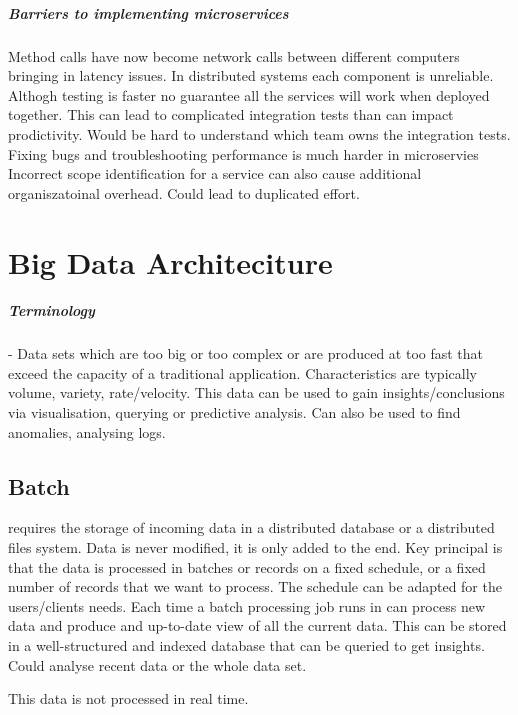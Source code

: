 \documentclass[a4paper, 11pt]{book}
\begin{document}
    \paragraph{Barriers to implementing microservices}
    Method calls have now become network calls between different computers bringing in latency issues.
    In distributed systems each component is unreliable.
    Althogh testing is faster no guarantee all the services will work when deployed together.
    This can lead to complicated integration tests than can impact prodictivity.
    Would be hard to understand which team owns the integration tests.
    Fixing bugs and troubleshooting performance is much harder in microservies
    Incorrect scope identification for a service can also cause additional organiszatoinal overhead.
    Could lead to duplicated effort.


    \chapter{Big Data Architeciture}

    \paragraph{Terminology} - Data sets which are too big or too complex or are produced at too fast that exceed the capacity of a traditional application.
    Characteristics are typically volume, variety, rate/velocity.
    This data can be used to gain insights/conclusions via visualisation, querying or predictive analysis.
    Can also be used to find anomalies, analysing logs.


    \section{Batch}
    requires the storage of incoming data in a distributed database or a distributed files system.
    Data is never modified, it is only added to the end.
    Key principal is that the data is processed in batches or records on a fixed schedule, or a fixed number of records that we want to process.
    The schedule can be adapted for the users/clients needs.
    Each time a batch processing job runs in can process new data and produce and up-to-date view of all the current data.
    This can be stored in a well-structured and indexed database that can be queried to get insights.
    Could analyse recent data or the whole data set.

    This data is not processed in real time.
\end{document}
